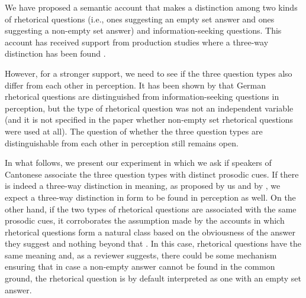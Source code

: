 \documentclass[output=paper,colorlinks,citecolor=brown            ,chinesefont]{langscibook}
\begin{document}
We have proposed a semantic account that makes a distinction among two kinds of rhetorical questions (i.e., ones suggesting an empty set answer and ones suggesting a non-empty set answer) and information-seeking questions. This account has received support from production studies where a three-way distinction has been found \citep{Lo+2019, Lo+2020}.

However, for a stronger support, we need to see if the three question types also differ from each other in perception. It has been shown by \citet{Kharaman+2019} that German rhetorical questions are distinguished from information-seeking questions in perception, but the type of rhetorical question was not an independent variable (and it is not specified in the paper whether non-empty set rhetorical questions were used at all). The question of whether the three question types are distinguishable from each other in perception still remains open. 

In what follows, we present our experiment in which we ask if speakers of Cantonese associate the three question types with distinct prosodic cues. If there is indeed a three-way distinction in meaning, as proposed by us and by \citet{Jamieson2018phd}, we expect a three-way distinction in form to be found in perception as well. On the other hand, if the two types of rhetorical questions are associated with the same prosodic cues, it corroborates the assumption made by the accounts in which rhetorical questions form a natural class based on the obviousness of the answer they suggest and nothing beyond that \citep{Biezma+2017}. In this case, rhetorical questions have the same meaning and, as a reviewer suggests, there could be some mechanism ensuring that in case a non-empty answer cannot be found in the common ground, the rhetorical question is by default interpreted as one with an empty set answer.
\end{document}

